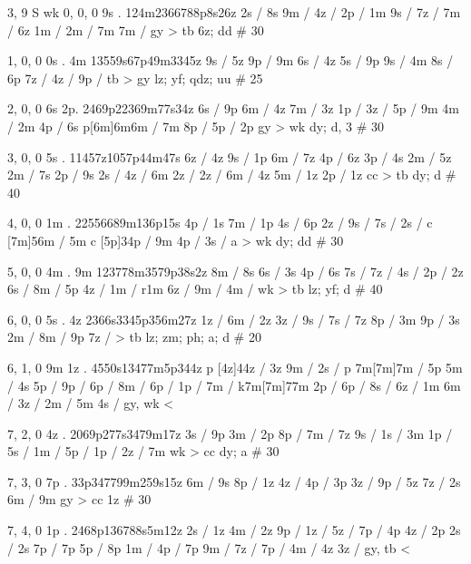 3, 9
S
wk
0, 0, 0
9s . 
124m2366788p8s26z
2s / 8s
9m /
4z / 
2p / 1m 
9s /
7z /
7m / 6z
1m / 
2m / 7m
7m / 
gy > tb 
6z; dd # 30 

1, 0, 0
0s . 4m 
13559s67p49m3345z
9s / 5z 
9p / 9m
6s / 4z  
5s / 9p
9s / 4m 
8s / 6p
7z /
4z /
9p / 
tb > gy 
lz; yf; qdz; uu # 25

2, 0, 0 
6s 2p.
2469p22369m77s34z
6s / 9p
6m / 4z 
7m / 3z 
1p / 
3z / 
5p / 9m
4m / 2m 
4p / 6s
p[6m]6m6m / 7m 
8p / 
5p / 2p 
gy > wk
dy; d, 3 # 30 

3, 0, 0
5s .
11457z1057p44m47s
6z / 4z 
9s / 1p 
6m / 7z
4p / 6z %
3p / 4s %
2m / 5z 
2m / 7s 
2p / 9s
2s / 
4z / 6m 
2z / 
2z / 
6m / 4z 
5m / 1z 
2p / 1z
cc > tb 
dy; d # 40 

4, 0, 0 
1m . 
22556689m136p15s
4p / 1s 
7m / 1p 
4s / 6p 
2z / 
9s / 
7s / 
2s / 
c [7m]56m / 5m 
c [5p]34p / 9m
4p / 
3s / a 
> wk 
dy; dd # 30 

5, 0, 0 
4m . 9m 
123778m3579p38s2z
8m / 8s
6s / 3s 
4p / 6s 
7s / 
7z / 
4s / 
2p / 2z 
6s / 
8m / 5p 
4z / 
1m / r1m
6z / 
9m / 
4m / 
wk > tb 
lz; yf; d # 40 

6, 0, 0
5s . 4z 
2366s3345p356m27z
1z / 
6m / 2z 
3z / 
9s / 
7s / 7z 
8p / 3m 
9p / 3s 
2m / 
8m / 9p
7z / 
> tb 
lz; zm; ph; a; d # 20 

6, 1, 0 
9m 1z . 
4550s13477m5p344z
p [4z]44z / 3z 
9m / 
2s / 
p 7m[7m]7m / 5p 
5m / 4s 
5p / 
9p / 
6p / 
8m / 
6p / 
1p / 
7m / k7m[7m]77m
2p / 
6p / 
8s / 
6z / 1m 
6m / 
3z / 
2m / 5m 
4s / 
gy, wk < 

7, 2, 0
4z . 
2069p277s3479m17z
3s / 9p 
3m / 2p 
8p / 
7m / 7z 
9s /
1s / 3m 
1p / 
5s / 
1m / 
5p /
1p / 
2z / 7m 
wk > cc 
dy; a # 30 

7, 3, 0 
7p . 
33p347799m259s15z
6m / 9s 
8p / 1z 
4z / 
4p / 3p 
3z / 
9p / 5z 
7z / 2s 
6m / 9m
gy > cc 
1z # 30 

7, 4, 0 
1p . 
2468p136788s5m12z
2s / 1z 
4m / 2z 
9p / 
1z /
5z / 
7p / 4p
4z / 2p 
2s / 2s %
7p / 7p %
5p / 8p %
1m / 
4p / 7p %
9m / 
7z /
7p /
4m / 4z 
3z / 
gy, tb <